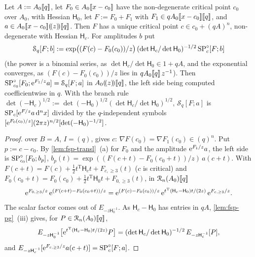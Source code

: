 \begin{cor}
\label{cor:fsp-movebase}
Let $A:=A_0[\![ q ]\!]$, let $F_0\in A_0[\![ x-c_0 ]\!]$ have the non-degenerate critical point $c_0$ over $A_0$, with Hessian $\mathsf H_0$, let $F:=F_0+F_1$ with $F_1\in qA_0[\![ x-c_0 ]\!][\![ q ]\!]$, and $a\in A_0[\![ x-c_0 ]\!](\!(z)\!)[\![ q ]\!]$. Then $F$ has a unique critical point $c\in c_0+(qA)^n$, non-degenerate with Hessian $\mathsf H_c$. For amplitudes $b$ put
\[
\mathcal S_q[F;b]:=\exp\bigl((F(c)-F_0(c_0))/z\bigr)\,(\det\mathsf H_c/\det\mathsf H_0)^{-1/2}\,\mathrm{SP}^{\circ}_c[F;b]
\]
(the power is a binomial series, as $\det\mathsf H_c/\det\mathsf H_0\in1+qA$, and the exponential converges, as $(F(c)-F_0(c_0))/z$ lies in $qA_0[\![ q ]\!]\,z^{-1}$). Then $\mathrm{SP}^{\circ}_{c_0}[F_0;\mathrm{e}^{F_1/z}a]=\mathcal S_q[F;a]$ in $A_0(\!(z)\!)[\![ q ]\!]$, the left side being computed coefficientwise in $q$. With the branch rule $\det(-\mathsf H_c)^{1/2}:=\det(-\mathsf H_0)^{1/2}(\det\mathsf H_c/\det\mathsf H_0)^{1/2}$, $\mathcal S_q[F;a]$ is $\mathrm{SP}_c[\mathrm{e}^{F/z}a\,\mathrm{d}^nx]$ divided by the $q$-independent symbols $[\mathrm{e}^{F_0(c_0)/z}](2\pi z)^{n/2}[\det(-\mathsf H_0)^{-1/2}]$.
\end{cor}

\begin{proof}
 over $B=A$, $I=(q)$, gives $c$: $\nabla F(c_0)=\nabla F_1(c_0)\in(q)^n$. Put $p:=c-c_0$. By \cref{lem:fsp-transl}~(a) for $F_0$ and the amplitude $\mathrm{e}^{F_1/z}a$, the left side is $\mathrm{SP}^{\circ}_{c_0}[F_0;b_p]$, $b_p(t)=\exp((F(c+t)-F_0(c_0+t))/z)\,a(c+t)$. With $F(c+t)=F(c)+\frac12t^{\mathrm T}\mathsf H_ct+F_{c,\geq3}(t)$ ($c$ is critical) and $F_0(c_0+t)=F_0(c_0)+\frac12t^{\mathrm T}\mathsf H_0t+F_{0,\geq3}(t)$, in $\mathcal{R}_n(A_0)[\![ q ]\!]$
\[
\mathrm{e}^{F_{0,\geq3}/z}\,\mathrm{e}^{(F(c+t)-F_0(c_0+t))/z}=\mathrm{e}^{(F(c)-F_0(c_0))/z}\,\mathrm{e}^{t^{\mathrm T}(\mathsf H_c-\mathsf H_0)t/(2z)}\,\mathrm{e}^{F_{c,\geq3}/z}.
\]
The scalar factor comes out of $E_{-z\mathsf H_0^{-1}}$. As $\mathsf H_c-\mathsf H_0$ has entries in $qA$, \cref{lem:fsp-pg}~(iii) gives, for $P\in\mathcal{R}_n(A_0)[\![ q ]\!]$,
\[
E_{-z\mathsf H_0^{-1}}\bigl[\mathrm{e}^{t^{\mathrm T}(\mathsf H_c-\mathsf H_0)t/(2z)}P\bigr]=(\det\mathsf H_c/\det\mathsf H_0)^{-1/2}\,E_{-z\mathsf H_c^{-1}}[P],
\]
and $E_{-z\mathsf H_c^{-1}}[\mathrm{e}^{F_{c,\geq3}/z}a(c+t)]=\mathrm{SP}^{\circ}_c[F;a]$.
\end{proof}

